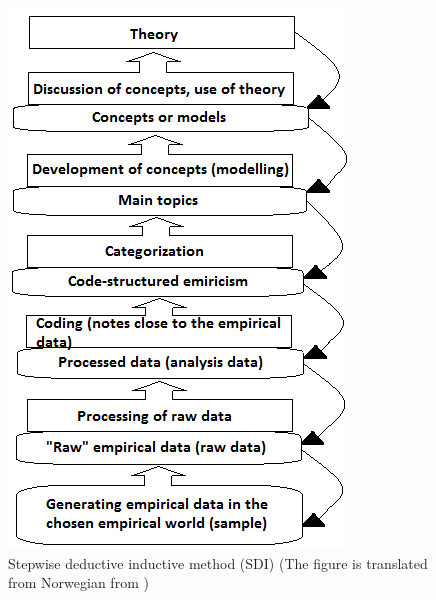 \begin{figure}
\centering
\includegraphics[scale=0.8]{sdi}
\caption[Stepwise deductive inductive method (SDI)]{Stepwise deductive inductive method (SDI) (The figure is translated from Norwegian from \cite{tjora})}
\label{fig:sdi}
\end{figure}

